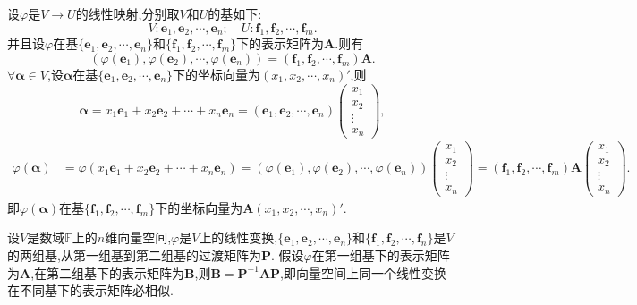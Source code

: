 \documentclass[lang=cn,newtx,10pt,scheme=chinese]{elegantbook}
\begin{document}
\begin{corollary}
设\(\varphi\)是\(V\rightarrow U\)的线性映射,分别取\(V\)和\(U\)的基如下:
\[
V: \boldsymbol{e}_1, \boldsymbol{e}_2, \cdots, \boldsymbol{e}_n; \quad U: \boldsymbol{f}_1, \boldsymbol{f}_2, \cdots, \boldsymbol{f}_m.
\]
并且设\(\varphi\)在基\(\{\boldsymbol{e}_1, \boldsymbol{e}_2, \cdots, \boldsymbol{e}_n\}\)和\(\{\boldsymbol{f}_1, \boldsymbol{f}_2, \cdots, \boldsymbol{f}_m\}\)下的表示矩阵为\(\boldsymbol{A}\).则有
\[
(\varphi(\boldsymbol{e}_1), \varphi(\boldsymbol{e}_2), \cdots, \varphi(\boldsymbol{e}_n)) = (\boldsymbol{f}_1, \boldsymbol{f}_2, \cdots, \boldsymbol{f}_m)\boldsymbol{A}.
\]
\(\forall \boldsymbol{\alpha} \in V\),设\(\boldsymbol{\alpha}\)在基\(\{\boldsymbol{e}_1, \boldsymbol{e}_2, \cdots, \boldsymbol{e}_n\}\)下的坐标向量为\((x_1, x_2, \cdots, x_n)'\),则
\[
\boldsymbol{\alpha} = x_1\boldsymbol{e}_1 + x_2\boldsymbol{e}_2 + \cdots + x_n\boldsymbol{e}_n = (\boldsymbol{e}_1, \boldsymbol{e}_2, \cdots, \boldsymbol{e}_n)\begin{pmatrix}
x_1 \\
x_2 \\
\vdots \\
x_n
\end{pmatrix},
\]
\begin{align*}
\varphi(\boldsymbol{\alpha}) &= \varphi(x_1\boldsymbol{e}_1 + x_2\boldsymbol{e}_2 + \cdots + x_n\boldsymbol{e}_n)
= (\varphi(\boldsymbol{e}_1), \varphi(\boldsymbol{e}_2), \cdots, \varphi(\boldsymbol{e}_n))\begin{pmatrix}
x_1 \\
x_2 \\
\vdots \\
x_n
\end{pmatrix} 
= (\boldsymbol{f}_1, \boldsymbol{f}_2, \cdots, \boldsymbol{f}_m)\boldsymbol{A}\begin{pmatrix}
x_1 \\
x_2 \\
\vdots \\
x_n
\end{pmatrix}.
\end{align*}
即\(\varphi(\boldsymbol{\alpha})\)在基\(\{\boldsymbol{f}_1, \boldsymbol{f}_2, \cdots, \boldsymbol{f}_m\}\)下的坐标向量为\(\boldsymbol{A}(x_1, x_2, \cdots, x_n)'\).
\end{corollary}

\begin{theorem}\label{theorem:向量空间上同一个线性变换在不同基下的表示矩阵必相似}
设\(V\)是数域\(\mathbb{F}\)上的\(n\)维向量空间,\(\varphi\)是\(V\)上的线性变换,\(\{\boldsymbol{e}_1,\boldsymbol{e}_2,\cdots,\boldsymbol{e}_n\}\)和\(\{\boldsymbol{f}_1,\boldsymbol{f}_2,\cdots,\boldsymbol{f}_n\}\)是\(V\)的两组基,从第一组基到第二组基的过渡矩阵为\(\boldsymbol{P}\). 假设\(\varphi\)在第一组基下的表示矩阵为\(\boldsymbol{A}\),在第二组基下的表示矩阵为\(\boldsymbol{B}\),则\(\boldsymbol{B}=\boldsymbol{P}^{-1}\boldsymbol{A}\boldsymbol{P}\),即向量空间上同一个线性变换在不同基下的表示矩阵必相似.
\end{theorem}
\end{document}
